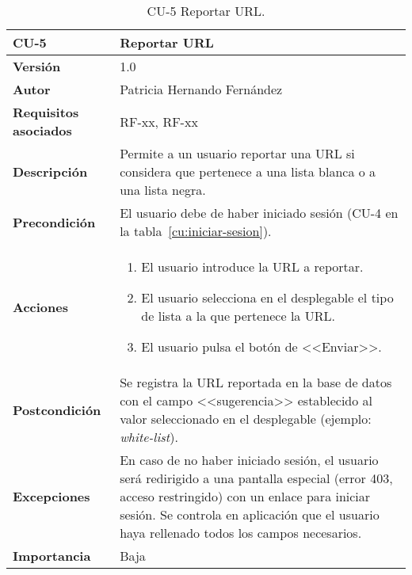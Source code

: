 \begin{table}[p]
	\centering
	\begin{tabularx}{\linewidth}{ p{} p{} }
		\toprule
		\textbf{CU-5}    & \textbf{Reportar URL}\\
		\toprule
		\textbf{Versión}              & 1.0    \\
		\textbf{Autor}                & Patricia Hernando Fernández \\
		\textbf{Requisitos asociados} & RF-xx, RF-xx \\
		\textbf{Descripción}          & Permite a un usuario reportar una
		URL si considera que pertenece a una lista blanca o a una lista negra.\\
		\textbf{Precondición}         & El usuario debe de haber iniciado sesión (CU-4 en la tabla~\ref{cu:iniciar-sesion}). \\
		\textbf{Acciones}             &
		\begin{enumerate}
			\def\labelenumi{\arabic{enumi}.}
			\tightlist
			\item El usuario introduce la URL a reportar.
			\item El usuario selecciona en el desplegable el tipo de lista a la que pertenece la URL.
			\item El usuario pulsa el botón de <<Enviar>>.
		\end{enumerate}\\
		\textbf{Postcondición}        & Se registra la URL reportada en la base de datos con el campo <<sugerencia>> establecido al valor seleccionado en el desplegable (ejemplo: \textit{white-list}). \\
		\textbf{Excepciones}          & En caso de no haber iniciado sesión, el usuario será redirigido a una pantalla especial (error 403, acceso restringido) con un enlace para iniciar sesión. Se controla en aplicación que el usuario haya rellenado todos los campos necesarios. \\
		\textbf{Importancia}          & Baja \\
		\bottomrule
	\end{tabularx}
	\caption{CU-5 Reportar URL.}
	\label{cu:reportar-url}
\end{table}